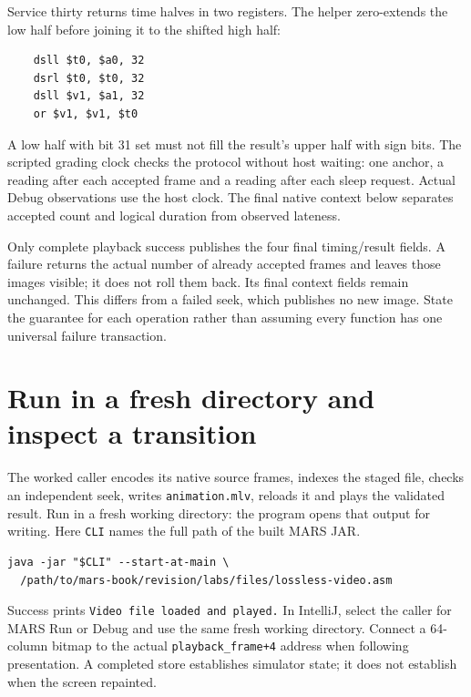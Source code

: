 Service thirty returns time halves in two registers. The helper zero-extends
the low half before joining it to the shifted high half:
\begin{verbatim}
    dsll $t0, $a0, 32
    dsrl $t0, $t0, 32
    dsll $v1, $a1, 32
    or $v1, $v1, $t0
\end{verbatim}
A low half with bit 31 set must not fill the result's upper half with sign bits.
The scripted grading clock checks the protocol without host waiting: one anchor,
a reading after each accepted frame and a reading after each sleep request.
Actual Debug observations use the host clock. The final native context below
separates accepted count and logical duration from observed lateness.


Only complete playback success publishes the four final timing/result fields.
A failure returns the actual number of already accepted frames and leaves
those images visible; it does not roll them back. Its final context fields
remain unchanged. This differs from a failed seek, which publishes no new
image. State the guarantee for each operation rather than assuming every
function has one universal failure transaction.

\section{Run in a fresh directory and inspect a transition}

The worked caller encodes its native source frames, indexes the staged file,
checks an independent seek, writes \texttt{animation.mlv}, reloads it and plays
the validated result. Run in a fresh working directory: the program opens that
output for writing. Here \texttt{CLI} names the full path of the built MARS JAR.
\begin{Verbatim}
java -jar "$CLI" --start-at-main \
  /path/to/mars-book/revision/labs/files/lossless-video.asm
\end{Verbatim}
Success prints \texttt{Video file loaded and played.} In IntelliJ, select the
caller for MARS Run or Debug and use the same fresh working directory. Connect
a 64-column bitmap to the actual \texttt{playback\_frame+4} address when
following presentation. A completed store establishes simulator state; it does
not establish when the screen repainted.

